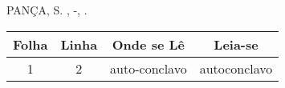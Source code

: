\begin{errata}
    PANÇA, S. \textbf{\titulo}\subtitulo \quad \instituicao, \cidade-\estado, \ano.
    \begin{table}[htb]
        \centering
        \begin{tabular}{|c|c|c|c|}
            \hline
            \textbf{Folha} & \textbf{Linha} & \textbf{Onde se Lê} & \textbf{Leia-se} \\ \hline
            1              & 2              & auto-conclavo       & autoconclavo     \\ \hline
        \end{tabular}
    \end{table}
\end{errata}